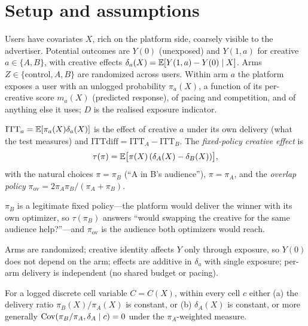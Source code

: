 \section{Setup and assumptions}

Users have covariates $X$, rich on the platform side, coarsely visible to the advertiser. Potential outcomes are $Y(0)$ (unexposed) and $Y(1, a)$ for creative $a \in \{A, B\}$, with creative effects $\delta_a(X) = \mathbb{E}[Y(1,a) - Y(0) \mid X]$. Arms $Z \in \{\text{control}, A, B\}$ are randomized across users. Within arm $a$ the platform exposes a user with an unlogged probability $\pi_a(X)$, a function of its per-creative score $m_a(X)$ (predicted response), of pacing and competition, and of anything else it uses; $D$ is the realised exposure indicator.

\begin{definition}[Estimands]
\label{algo:def:estimands}
$\mathrm{ITT}_a = \mathbb{E}[\pi_a(X)\delta_a(X)]$ is the effect of creative $a$ under its own delivery (what the test measures) and $\mathrm{ITTdiff} = \mathrm{ITT}_A - \mathrm{ITT}_B$. The \emph{fixed-policy creative effect} is
\begin{equation}
\tau(\pi) = \mathbb{E}\big[\pi(X)\,(\delta_A(X) - \delta_B(X))\big],
\label{eq:algo:tau}
\end{equation}
with the natural choices $\pi = \pi_B$ (``A in B's audience''), $\pi = \pi_A$, and the \emph{overlap policy} $\pi_{\mathrm{ov}} = 2\pi_A\pi_B/(\pi_A + \pi_B)$.
\end{definition}

$\pi_B$ is a legitimate fixed policy---the platform would deliver the winner with its own optimizer, so $\tau(\pi_B)$ answers ``would swapping the creative for the same audience help?''---and $\pi_{\mathrm{ov}}$ is the audience both optimizers would reach.

\begin{assumption}
\label{algo:ass:design}
Arms are randomized; creative identity affects $Y$ only through exposure, so $Y(0)$ does not depend on the arm; effects are additive in $\delta_a$ with single exposure; per-arm delivery is independent (no shared budget or pacing).
\end{assumption}

\begin{assumption}
\label{algo:ass:ratio}
For a logged discrete cell variable $C = C(X)$, within every cell $c$ either (a) the delivery ratio $\pi_B(X)/\pi_A(X)$ is constant, or (b) $\delta_A(X)$ is constant, or more generally $\operatorname{Cov}(\pi_B/\pi_A, \delta_A \mid c) = 0$ under the $\pi_A$-weighted measure.
\end{assumption}

